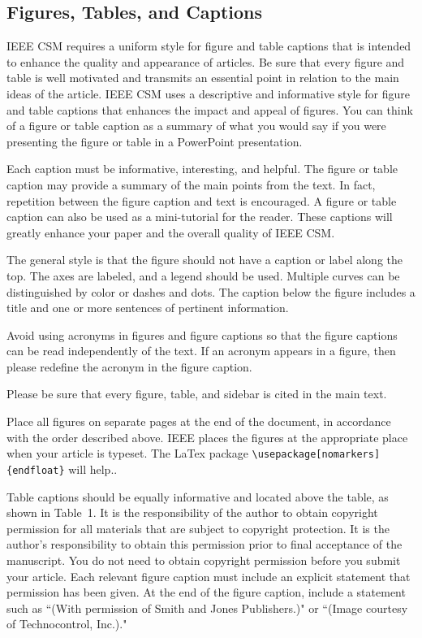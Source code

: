 \subsection{Figures, Tables, and Captions} \label{FTC}
IEEE CSM requires a uniform style for figure and table captions that is intended to enhance the quality and appearance of articles. 
Be sure that every figure and table is well motivated and transmits an essential point in relation to the main ideas of the article.  
%
IEEE CSM uses a descriptive and informative style for figure and table captions that enhances the impact and appeal of figures.  You can think of a figure or table caption as a summary of what you would say if you were presenting the figure or table in a PowerPoint presentation.  

Each caption must be informative, interesting, and helpful.  The figure or table caption may provide a summary of the main points from the text.  In fact, repetition between the figure caption and text is encouraged.  A figure or table caption can also be used as a mini-tutorial for the reader.   These captions will greatly enhance your paper and the overall quality of IEEE CSM.

The general style is that the figure should not have a caption or label along the top. The axes are labeled, and a legend should be used. Multiple curves can be distinguished by color or dashes and dots. The caption below the figure includes a title and one or more sentences of pertinent information.
\bee
\item Avoid using acronyms in figures and figure captions so that the figure captions can be read independently of the text.  If an acronym appears in a figure, then please redefine the acronym in the figure caption.
\item Please be sure that every figure, table, and sidebar is cited in the main text.
\item Place all figures on separate pages at the end of the document, in accordance with the order described above.  IEEE places the figures at the appropriate place when your article is typeset. The LaTex package \verb!\usepackage[nomarkers]{endfloat}! will help..
\item Table captions should be equally informative and located above the table, as shown in Table~1.
\eee
It is the responsibility of the author to obtain copyright permission for all materials that are subject to copyright protection.  It is the author’s responsibility to obtain this permission prior to final acceptance of the manuscript.  You do not need to obtain copyright permission before you submit your article. Each relevant figure caption must include an explicit statement that permission has been given.  At the end of the figure caption, include a statement such as ``(With permission of Smith and Jones Publishers.)" or ``(Image courtesy of Technocontrol, Inc.)."


